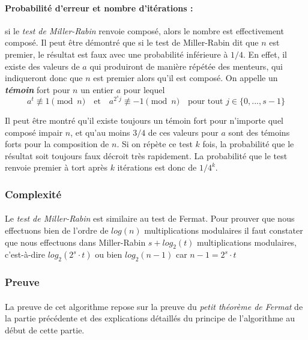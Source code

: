 	
		\paragraph{Probabilité d'erreur et nombre d'itérations :} si le \textit{test de Miller-Rabin} renvoie composé, alors le nombre est effectivement composé. Il peut être démontré que si le test de Miller-Rabin dit que $n$ est premier, le résultat est faux avec une probabilité inférieure à $1/4$. En effet, il existe des valeurs de $a$ qui produiront de manière répétée des menteurs, qui indiqueront donc que $n$ est premier alors qu'il est composé. On appelle un \textit{\textbf{témoin}} fort pour $n$ un entier $a$ pour lequel
		\[a^{t} \not\equiv 1 \pmod n \quad \text{et} \quad a^{2^{s}j} \not\equiv -1 \pmod n \quad \text{pour tout } j \in \{0, ..., s - 1\}\]
		
		Il peut être montré qu'il existe toujours un témoin fort pour n'importe quel composé impair $n$, et qu'au moins $3/4$ de ces valeurs pour $a$ sont des témoins forts pour la composition de $n$. Si on répète ce test $k$ fois, la probabilité que le résultat soit toujours faux décroit très rapidement. La probabilité que le test renvoie premier à tort après $k$ itérations est donc de $1/4^{k}$.
		
	\subsubsection{Complexité}
		\paragraph{}Le \textit{test de Miller-Rabin} est similaire au test de Fermat. Pour prouver que nous effectuons bien de l'ordre de $log(n)$ multiplications modulaires il faut constater que nous effectuons dans Miller-Rabin $s + log_{2}(t)$ multiplications modulaires, c'est-à-dire $log_{2}(2^{s} \cdot t)$ ou bien $log_{2}(n - 1)$ car $n - 1 = 2^{s} \cdot t$
		
	\subsubsection{Preuve}
		\paragraph{}La preuve de cet algorithme repose sur la preuve du \textit{petit théorème de Fermat} de la partie précédente et des explications détaillés du principe de l'algorithme au début de cette partie.
		
